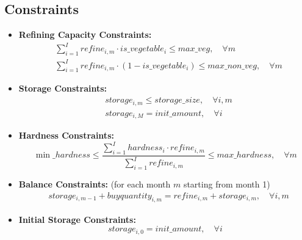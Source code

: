 \documentclass{article}
\begin{document}
\subsection*{Constraints}

\begin{itemize}
    \item \textbf{Refining Capacity Constraints:}
    \begin{align*}
        &\sum_{i=1}^{I} refine_{i,m} \cdot is\_vegetable_i \leq max\_veg, \quad \forall m \\
        &\sum_{i=1}^{I} refine_{i,m} \cdot (1 - is\_vegetable_i) \leq max\_non\_veg, \quad \forall m 
    \end{align*}

    \item \textbf{Storage Constraints:}
    \begin{align*}
        &storage_{i,m} \leq storage\_size, \quad \forall i, m \\
        &storage_{i,M} = init\_amount, \quad \forall i
    \end{align*}

    \item \textbf{Hardness Constraints:}
    \[
    \min\_hardness \leq \frac{\sum_{i=1}^{I} hardness_i \cdot refine_{i,m}}{\sum_{i=1}^{I} refine_{i,m}} \leq max\_hardness, \quad \forall m
    \]

    \item \textbf{Balance Constraints:} (for each month $m$ starting from month 1)
    \begin{align*}
        &storage_{i,m-1} + buyquantity_{i,m} = refine_{i,m} + storage_{i,m}, \quad \forall i, m
    \end{align*}
    \item \textbf{Initial Storage Constraints:}
    \[
    storage_{i,0} = init\_amount, \quad \forall i
    \]
\end{itemize}
\end{document}
